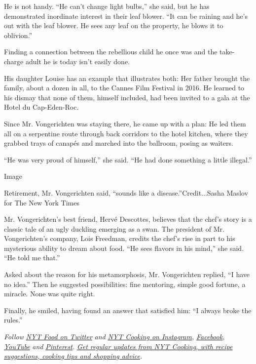 He is not handy. ``He can't change light bulbs,'' she said, but he has
demonstrated inordinate interest in their leaf blower. ``It can be
raining and he's out with the leaf blower. He sees any leaf on the
property, he blows it to oblivion.''

Finding a connection between the rebellious child he once was and the
take-charge adult he is today isn't easily done.

His daughter Louise has an example that illustrates both: Her father
brought the family, about a dozen in all, to the Cannes Film Festival in
2016. He learned to his dismay that none of them, himself included, had
been invited to a gala at the Hotel du Cap-Eden-Roc.

Since Mr. Vongerichten was staying there, he came up with a plan: He led
them all on a serpentine route through back corridors to the hotel
kitchen, where they grabbed trays of canapés and marched into the
ballroom, posing as waiters.

``He was very proud of himself,'' she said. ``He had done something a
little illegal.''

Image

Retirement, Mr. Vongerichten said, ``sounds like a
disease.''Credit...Sasha Maslov for The New York Times

Mr. Vongerichten's best friend, Hervé Descottes, believes that the
chef's story is a classic tale of an ugly duckling emerging as a swan.
The president of Mr. Vongerichten's company, Lois Freedman, credits the
chef's rise in part to his mysterious ability to dream about food. ``He
sees flavors in his mind,'' she said. ``He told me that.''

Asked about the reason for his metamorphosis, Mr. Vongerichten replied,
``I have no idea.'' Then he suggested possibilities: fine mentoring,
simple good fortune, a miracle. None was quite right.

Finally, he smiled, having found an answer that satisfied him: ``I
always broke the rules.''

\emph{Follow} \href{https://twitter.com/nytfood}{\emph{NYT Food on
Twitter}} \emph{and}
\href{https://www.instagram.com/nytcooking/}{\emph{NYT Cooking on
Instagram}}\emph{,}
\href{https://www.facebookcorewwwi.onion/nytcooking/}{\emph{Facebook}}\emph{,}
\href{https://www.youtube.com/nytcooking}{\emph{YouTube}} \emph{and}
\href{https://www.pinterest.com/nytcooking/}{\emph{Pinterest}}\emph{.}
\href{https://www.nytimes3xbfgragh.onion/newsletters/cooking}{\emph{Get
regular updates from NYT Cooking, with recipe suggestions, cooking tips
and shopping advice}}\emph{.}

